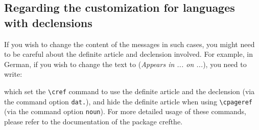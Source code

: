 \documentclass[
    title in boldface,
    emphasize theorems,
    simple name, %
    name in link,
]{einfart}
\newcommand{\commandoption}[1]{\textcolor{code-keys}{\texttt{#1}}}
\begin{document}

\subsection{Regarding the customization for languages with declensions}

If you wish to change the content of the messages in such cases, you might need to be careful about the definite article and declension involved. For example, in German, if you wish to change the text to  (\emph{Appears in ... on ...}), you need to write:
\begin{code}
\SetForwardReferenceRefForm{\crefthe[in,(*\commandoption{dat.}*)]}
\SetForwardReferencePagerefForm{\cpagerefthe[(*\commandoption{noun}*)]}
\end{code}
which set the \lstinline|\cref| command to use the definite article  and the declension  (via the command option \commandoption{dat.}), and hide the definite article when using \lstinline|\cpageref| (via the command option \commandoption{noun}). For more detailed usage of these commands, please refer to the documentation of the package \textsf{crefthe}.
\end{document}

